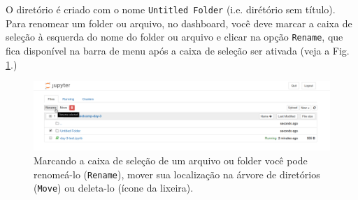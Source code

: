 O diretório é criado com o nome {\tt Untitled Folder} (i.e. dirétório sem título). Para renomear um folder ou arquivo, no dashboard, você deve marcar a caixa de seleção à esquerda do nome do folder ou arquivo e clicar na opção {\tt Rename}, que fica disponível na barra de menu após a caixa de seleção ser ativada (veja a Fig. \ref{fig:JN-Rename}.)
\begin{figure}[h!]
\centering
\includegraphics[scale=0.28]{Images/rename-folder.png}
\caption{Marcando a caixa de seleção de um arquivo ou folder você pode renomeá-lo ({\tt Rename}), mover sua localização na árvore de diretórios ({\tt Move}) ou deleta-lo (ícone da lixeira). }\label{fig:JN-Rename}
\end{figure}

